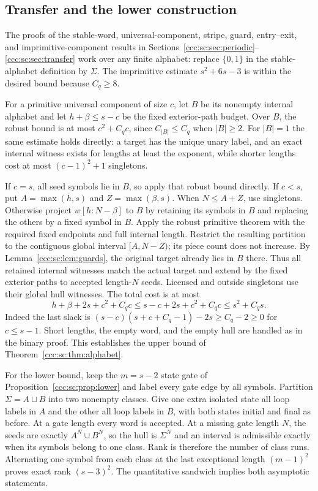 \documentclass[11pt,letterpaper]{article}
\theoremstyle{definition}
\theoremstyle{remark}
\begin{document}
\subsection{Transfer and the lower construction}

The proofs of the stable-word, universal-component, stripe, guard, entry--exit, and imprimitive-component results in Sections~\ref{ccc:sc:sec:periodic}--\ref{ccc:sc:sec:transfer} work over any finite alphabet: replace $\{0,1\}$ in the stable-alphabet definition by $\Sigma$. The imprimitive estimate $s^2+6s-3$ is within the desired bound because $C_q\ge8$.

For a primitive universal component of size $c$, let $B$ be its nonempty internal alphabet and let $h+\beta\le s-c$ be the fixed exterior-path budget. Over $B$, the robust bound is at most $c^2+C_qc$, since $C_{|B|}\le C_q$ when $|B|\ge2$. For $|B|=1$ the same estimate holds directly: a target has the unique unary label, and an exact internal witness exists for lengths at least the exponent, while shorter lengths cost at most $(c-1)^2+1$ singletons.

If $c=s$, all seed symbols lie in $B$, so apply that robust bound directly. If $c<s$, put $A=\max(h,s)$ and $Z=\max(\beta,s)$. When $N\le A+Z$, use singletons. Otherwise project $w[h:N-\beta]$ to $B$ by retaining its symbols in $B$ and replacing the others by a fixed symbol in $B$. Apply the robust primitive theorem with the required fixed endpoints and full internal length. Restrict the resulting partition to the contiguous global interval $[A,N-Z)$; its piece count does not increase. By Lemma~\ref{ccc:sc:lem:guards}, the original target already lies in $B$ there. Thus all retained internal witnesses match the actual target and extend by the fixed exterior paths to accepted length-$N$ seeds. Licensed and outside singletons use their global hull witnesses. The total cost is at most
\[
 h+\beta+2s+c^2+C_qc\le s-c+2s+c^2+C_qc\le s^2+C_qs.
\]
Indeed the last slack is $(s-c)(s+c+C_q-1)-2s\ge C_q-2\ge0$ for $c\le s-1$. Short lengths, the empty word, and the empty hull are handled as in the binary proof. This establishes the upper bound of Theorem~\ref{ccc:sc:thm:alphabet}.

For the lower bound, keep the $m=s-2$ state gate of Proposition~\ref{ccc:sc:prop:lower} and label every gate edge by all symbols. Partition $\Sigma=A\sqcup B$ into two nonempty classes. Give one extra isolated state all loop labels in $A$ and the other all loop labels in $B$, with both states initial and final as before. At a gate length every word is accepted. At a missing gate length $N$, the seeds are exactly $A^N\cup B^N$, so the hull is $\Sigma^N$ and an interval is admissible exactly when its symbols belong to one class. Rank is therefore the number of class runs. Alternating one symbol from each class at the last exceptional length $(m-1)^2$ proves exact rank $(s-3)^2$. The quantitative sandwich implies both asymptotic statements.
\end{document}
